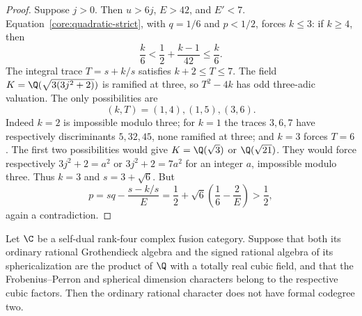 \begin{proof}
Suppose $j>0$. Then $u>6j$, $E>42$, and $E'<7$.
Equation~\eqref{core:quadratic-strict}, with
$q=1/6$ and $p<1/2$, forces $k\leq3$: if $k\geq4$, then
\[
 \frac k6<\frac12+\frac{k-1}{42}\leq\frac k6.
\]
The integral trace $T=s+k/s$ satisfies $k+2\leq T\leq7$.
The field $K=\Q(\sqrt{3(3j^2+2)})$ is ramified at three,
so $T^2-4k$ has odd three-adic valuation. The only possibilities are
\[
 (k,T)=(1,4),(1,5),(3,6).
\]
Indeed $k=2$ is impossible modulo three; for $k=1$ the traces
$3,6,7$ have respectively discriminants $5,32,45$, none ramified
at three; and $k=3$ forces $T=6$.
The first two possibilities would give $K=\Q(\sqrt3)$ or
$\Q(\sqrt{21})$. They would force respectively
$3j^2+2=a^2$ or $3j^2+2=7a^2$ for an integer $a$, impossible
modulo three. Thus $k=3$ and $s=3+\sqrt6$. But
\[
 p=sq-\frac{s-k/s}{E}
   =\frac12+\sqrt6\left(\frac16-\frac2E\right)>\frac12,
\]
again a contradiction.
\end{proof}


\begin{proposition}\label{inv:prop:cubic-rational-two-impossible}
Let $\C$ be a self-dual rank-four complex fusion category. Suppose
that both its ordinary rational Grothendieck algebra and the signed
rational algebra of its sphericalization are the product of $\Q$
with a totally real cubic field, and that the Frobenius--Perron and
spherical dimension characters belong to the respective cubic factors.
Then the ordinary rational character does not have formal codegree two.
\end{proposition}

